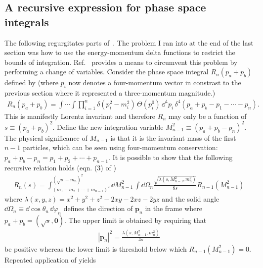 \vspace{7px}
\subsection{A recursive expression for phase space integrals}\label{subsec:recursive-relation}
The following regurgitates parts of~\cite{Byckling:1969sx,Isaacson:2021xty}.
The problem I ran into at the end of the last section was how to use the energy-momentum delta functions to restrict the bounds of integration. Ref.~\cite{Byckling:1969sx} provides a means to circumvent this problem by performing a change of variables. 
Consider the phase space integral $R_n(p_a + p_b)$ defined by (where $p_i$ now denotes a four-momentum vector in constrast to the previous section where it represented a three-momentum magnitude.)
\begin{align}
    R_n(p_a + p_b) = 
    \int \cdots \int \prod_{i=1}^{n} \delta (p_i^2 - m_i^2) \, \Theta(p_i^0) \, 
    \dd^4 p_i \, \delta^4(p_a + p_b - p_1 - \cdots - p_n).
\end{align}
This is manifestly Lorentz invariant and therefore $R_n$ may only be a function of $s \equiv (p_a + p_b)^2$. 
Define the new integration variable $M_{n-1}^2 \equiv (p_a + p_b - p_n)^2$. The physical significance of $M_{n-1}$ is that it is the invariant mass of the first $n-1$ particles, which can be seen using four-momentum conservation: $p_a + p_b - p_n = p_1 + p_2 + \cdots + p_{n-1}$.
It is possible to show that the following recursive relation holds (eqn. (3) of \cite{Byckling:1969sx})
\begin{align}
    \label{eq:recursive-phase-space-relation}
    R_n(s) = 
    \int_{(m_1 + m_2 + \cdots + m_{n-1})^2}^{(\sqrt{s} - m_n)^2} 
    \dd M^2_{n-1} \, \int \dd \Omega_n
    \frac{\sqrt{\lambda(s, M_{n-1}^2, m_n^2)}}{8s} R_{n-1}(M_{n-1}^2)
\end{align}
where $\lambda(x, y, z) = x^2 + y^2 + z^2 - 2 xy - 2 xz - 2yz$ and the solid angle $\dd \Omega_n \equiv \dd \cos \theta_n\, \dd \varphi_n$ defines the direction of $\bm{p}_n$ in the frame where $p_a + p_b = (\sqrt{s}, \bm{0})$. 
The upper limit is obtained by requiring that 
\begin{align}
    |\bm{p}_n|^2 = \frac{\lambda(s, M_{n-1}^2, m_n^2)}{4 s}
\end{align}
be positive whereas the lower limit is threshold below which $R_{n-1}(M_{n-1}^2) = 0$\footnotemark. 
Repeated application of  yields 

